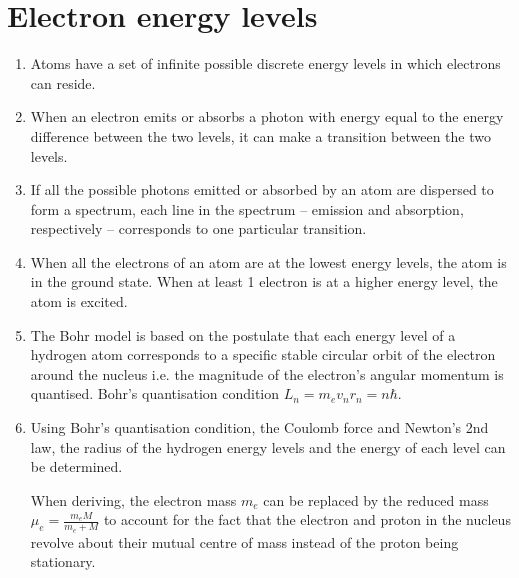 \section{Electron energy levels}
\begin{enumerate}
    \item Atoms have a set of infinite possible discrete energy levels in which electrons can reside.
    \item When an electron emits or absorbs a photon with energy equal to the energy difference between the two levels, it can make a transition between the two levels.
    \item If all the possible photons emitted or absorbed by an atom are dispersed to form a spectrum, each line in the spectrum -- emission and absorption, respectively -- corresponds to one particular transition.
    \item When all the electrons of an atom are at the lowest energy levels, the atom is in the ground state. When at least 1 electron is at a higher energy level, the atom is excited.
    \item The Bohr model is based on the postulate that each energy level of a hydrogen atom corresponds to a specific stable circular orbit of the electron around the nucleus i.e. the magnitude of the electron's angular momentum is quantised. Bohr's quantisation condition \(L_n =m_ev_nr_n = n\hbar\).
    \item Using Bohr's quantisation condition, the Coulomb force and Newton's 2nd law, the radius of the hydrogen energy levels and the energy of each level can be determined.

    When deriving, the electron mass \(m_e\) can be replaced by the reduced mass \(\mu_e = \frac{m_eM}{m_e+M}\) to account for the fact that the electron and proton in the nucleus revolve about their mutual centre of mass instead of the proton being stationary.
\end{enumerate}
